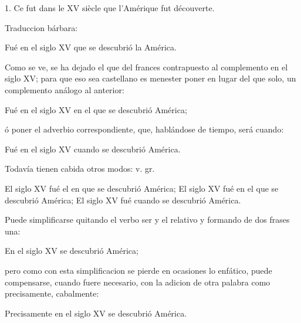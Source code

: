 ﻿\documentclass{book}
\begin{document}
1. Ce fut dans le XV siècle que l'Amérique fut découverte.

Traduccion bárbara:

Fué en el siglo XV que se descubrió la América.

Como se ve, se ha dejado el que del frances contrapuesto al complemento en el siglo XV; para que eso sea castellano es menester poner en lugar del que solo, un complemento análogo al anterior:

Fué en el siglo XV en el que se descubrió América;

ó poner el adverbio correspondiente, que, hablándose de tiempo, será cuando:

Fué en el siglo XV cuando se descubrió América.

Todavía tienen cabida otros modos: v. gr.

El siglo XV  fué  el en que se descubrió América;
El siglo XV  fué  en el que se descubrió América;
El siglo XV  fué  cuando se descubrió América.

Puede simplificarse quitando el verbo ser y el relativo y formando de dos frases una:

En el siglo XV se descubrió América;

pero como con esta simplificacion se pierde en ocasiones lo enfático, puede compensarse, cuando fuere necesario, con la adicion de otra palabra como precisamente, cabalmente:

Precisamente en el siglo XV se descubrió América.
\end{document}
